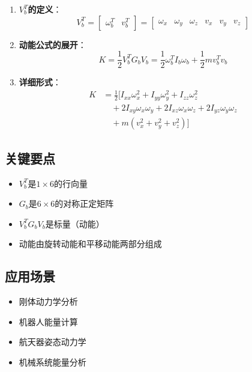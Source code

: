 \documentclass[12pt,a4paper]{article}
\begin{document}
\begin{enumerate}
\item \textbf{$V_b^T$的定义}：
\begin{equation}
V_b^T = \begin{bmatrix} \omega_b^T & v_b^T \end{bmatrix} = \begin{bmatrix} \omega_x & \omega_y & \omega_z & v_x & v_y & v_z \end{bmatrix}
\end{equation}

\item \textbf{动能公式的展开}：
\begin{equation}
K = \frac{1}{2}V_b^T G_b V_b = \frac{1}{2}\omega_b^T I_b \omega_b + \frac{1}{2}mv_b^T v_b
\end{equation}

\item \textbf{详细形式}：
\begin{align}
K &= \frac{1}{2}[I_{xx}\omega_x^2 + I_{yy}\omega_y^2 + I_{zz}\omega_z^2 \\
&\quad + 2I_{xy}\omega_x\omega_y + 2I_{xz}\omega_x\omega_z + 2I_{yz}\omega_y\omega_z \\
&\quad + m(v_x^2 + v_y^2 + v_z^2)]
\end{align}
\end{enumerate}

\subsection{关键要点}

\begin{itemize}
\item $V_b^T$是$1 \times 6$的行向量
\item $G_b$是$6 \times 6$的对称正定矩阵
\item $V_b^T G_b V_b$是标量（动能）
\item 动能由旋转动能和平移动能两部分组成
\end{itemize}

\subsection{应用场景}

\begin{itemize}
\item 刚体动力学分析
\item 机器人能量计算
\item 航天器姿态动力学
\item 机械系统能量分析
\end{itemize}
\end{document}
